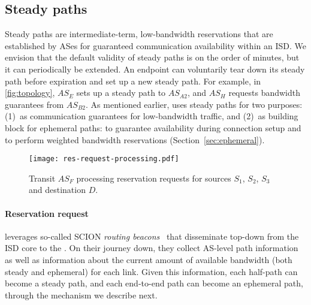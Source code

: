 \subsection{Steady paths}

\noindent Steady paths are intermediate-term, low-bandwidth
reservations that are established by ASes for guaranteed
communication availability within an ISD. We envision that the
default validity of steady paths is on the order of minutes, but it
can periodically be extended. An endpoint \AD can voluntarily tear
down its steady path before expiration and set up a new steady path.
For example, in \autoref{fig:topology}, $AS_E$ sets up a steady path
to $AS_{A2}$, and $AS_H$ requests bandwidth guarantees from
$AS_{B2}$. As mentioned earlier, \name uses steady paths for two
purposes: (1)~as communication guarantees for low-bandwidth
traffic, and (2)~as building block for ephemeral paths: to
guarantee availability during connection setup and to perform
weighted bandwidth reservations (Section~\ref{sec:ephemeral}).

\begin{figure}[t]
  \begin{center}
  \texttt{[image: res-request-processing.pdf]}
  \end{center}
  \caption{Transit $AS_F$ processing reservation requests for sources $S_1$, $S_2$, $S_3$ and
  destination $D$.}
  \vspace{-5mm}
  \label{fig:reservation}
\end{figure}



\paragraph{Reservation request}
\name leverages so-called SCION \emph{routing beacons}~\cite{scion2015} that
disseminate top-down from the ISD core to the \ADs. On their journey down, they
collect AS-level path information as well as information about the current
amount of available bandwidth (both steady and ephemeral) for each link.
\ifFullVersion
Given this information, each half-path can become a steady
path, and each end-to-end path can become an ephemeral path,
through the mechanism we describe next.

